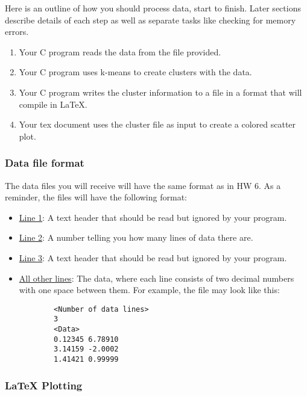 Here is an outline of how you should process data, start to finish.
Later sections describe details of each step as well as separate tasks like checking for memory errors.
\begin{enumerate}
    \item Your C program reads the data from the file provided.
    \item Your C program uses k-means to create clusters with the data.
    \item Your C program writes the cluster information to a file in a format that will compile in \LaTeX{}.
    \item Your tex document uses the cluster file as input to create a colored scatter plot.
\end{enumerate}

\subsubsection*{Data file format}

The data files you will receive will have the same format as in HW 6.
As a reminder, the files will have the following format:
\begin{itemize}
    \item \underline{Line 1}: A text header that should be read but ignored by your program.
    \item \underline{Line 2}: A number telling you how many lines of data there are.
    \item \underline{Line 3}:  A text header that should be read but ignored by your program.
    \item \underline{All other lines}: The data, where each line consists of two decimal numbers with one space between them.
    For example, the file may look like this:
    \begin{verbatim}
        <Number of data lines>
        3
        <Data>
        0.12345 6.78910
        3.14159 -2.0002
        1.41421 0.99999
    \end{verbatim}
\end{itemize}

\subsubsection*{\LaTeX{} Plotting}

